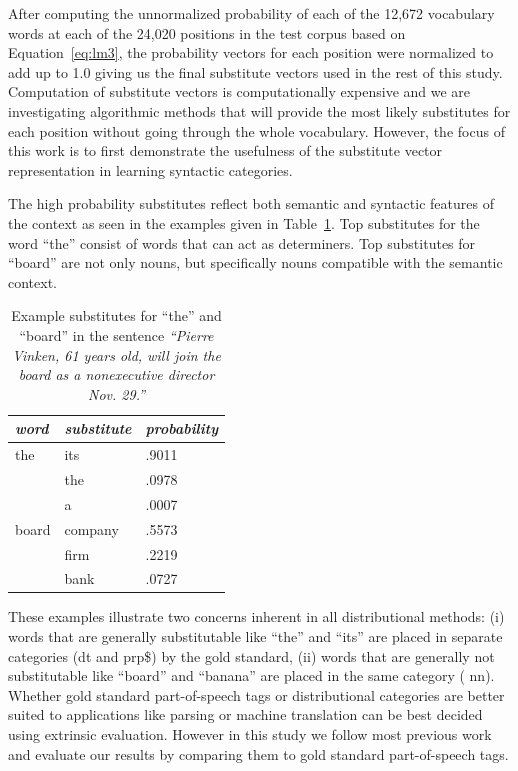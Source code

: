 \documentclass[11pt]{article}
\begin{document}
After computing the unnormalized probability of each of the 12,672
vocabulary words at each of the 24,020 positions in the test corpus
based on Equation~\ref{eq:lm3}, the probability vectors for each
position were normalized to add up to 1.0 giving us the final
substitute vectors used in the rest of this study.  Computation of
substitute vectors is computationally expensive and we are
investigating algorithmic methods that will provide the most likely
substitutes for each position without going through the whole
vocabulary.  However, the focus of this work is to first demonstrate
the usefulness of the substitute vector representation in learning
syntactic categories.

The high probability substitutes reflect both semantic and syntactic
features of the context as seen in the examples given in
Table~\ref{tab:subs}.  Top substitutes for the word ``the'' consist of
words that can act as determiners.  Top substitutes for ``board'' are
not only nouns, but specifically nouns compatible with the semantic
context.

\begin{table}[h]\centering
\begin{tabular}{|l|ll|} \hline
\emph{word} & \emph{substitute} & \emph{probability} \\ \hline
the	& its & .9011 \\
	& the & .0978 \\
	& a & .0007 \\ \hline
board	& company & .5573 \\
	& firm & .2219 \\
	& bank & .0727 \\ \hline
\end{tabular}
\caption{Example substitutes for ``the'' and ``board'' in the sentence {\em ``Pierre Vinken, 61 years old, will join the  board as a nonexecutive director Nov. 29.''}}
\label{tab:subs}
\end{table}

These examples illustrate two concerns inherent in all distributional
methods: (i) words that are generally substitutable like ``the'' and
``its'' are placed in separate categories ({\sc dt} and {\sc prp\$})
by the gold standard, (ii) words that are generally not substitutable
like ``board'' and ``banana'' are placed in the same category ({\sc
  nn}).  Whether gold standard part-of-speech tags or distributional
categories are better suited to applications like parsing or machine
translation can be best decided using extrinsic evaluation.  However
in this study we follow most previous work and evaluate our results by
comparing them to gold standard part-of-speech tags.
\end{document}
